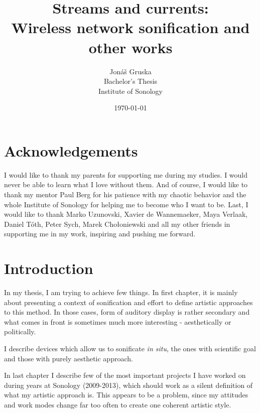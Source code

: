 \documentclass[12pt,a4paper,oneside]{report}
\title{Streams and currents:\\Wireless network sonification and other works}
\author{Jonáš Gruska\\
Bachelor's Thesis\\
Institute of Sonology}
\date{\today}
\begin{document}
\frenchspacing
\raggedbottom
{}       %

\maketitle

\begin{abstract}
\end{abstract}
\clearpage
\setcounter{page}{3}


\chapter*{Acknowledgements}
I would like to thank my parents for supporting me during my studies. I would never be able to learn what I love without them. And of course, I would like to thank my mentor Paul Berg for his patience with my chaotic behavior and the whole Institute of Sonology for helping me to become who I want to be. Last, I would like to thank Marko Uzunovski, Xavier de Wannemaeker, Maya Verlaak, Daniel Tóth, Peter Sych, Marek Chołoniewski and all my other friends in supporting me in my work, inspiring and pushing me forward.

\setcounter{tocdepth}{1}
\tableofcontents


\chapter{Introduction}

In my thesis, I am trying to achieve few things. In first chapter, it is mainly about presenting a context of sonification and effort to define artistic approaches to this method. In those cases, form of auditory display is rather secondary and what comes in front is sometimes much more interesting - aesthetically or politically. 

I describe devices which allow us to sonificate \textit{in situ}, the ones with scientific goal and those with purely aesthetic approach.

In last chapter I describe few of the most important projects I have worked on during years at Sonology (2009-2013), which should work as a silent definition of what my artistic approach is. This appears to be a problem, since my attitudes and work modes change far too often to create one coherent artistic style.
\end{document}
